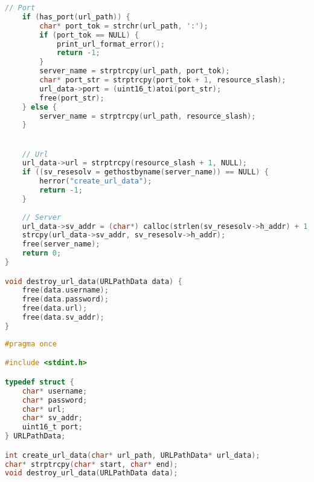 \begin{lstlisting}[language=C, caption=url\_path\_parser.c]
    // Port
    if (has_port(url_path)) {
        char* port_tok = strchr(url_path, ':');
        if (port_tok == NULL) {
            print_url_format_error();
            return -1;
        }
        server_name = strptrcpy(url_path, port_tok);
        char* port_str = strptrcpy(port_tok + 1, resource_slash);
        url_data->port = (uint16_t)atoi(port_str);
        free(port_str);
    } else {
        server_name = strptrcpy(url_path, resource_slash);
    }


    // Url
    url_data->url = strptrcpy(resource_slash + 1, NULL);
    if ((sv_resesolv = gethostbyname(server_name)) == NULL) {
        herror("create_url_data");
        return -1;
    }
    
    // Server
    url_data->sv_addr = (char*) calloc(strlen(sv_resesolv->h_addr) + 1, sizeof(char));
    strcpy(url_data->sv_addr, sv_resesolv->h_addr);
    free(server_name);
    return 0;
}

void destroy_url_data(URLPathData data) {
    free(data.username);
    free(data.password);
    free(data.url);
    free(data.sv_addr);
}
\end{lstlisting}



\begin{lstlisting}[language=C, caption=url\_path\_parser.h]
#pragma once

#include <stdint.h>

typedef struct {
    char* username;
    char* password;
    char* url;
    char* sv_addr;
    uint16_t port;
} URLPathData;

int create_url_data(char* url_path, URLPathData* url_data);
char* strptrcpy(char* start, char* end);
void destroy_url_data(URLPathData data);
\end{lstlisting}


